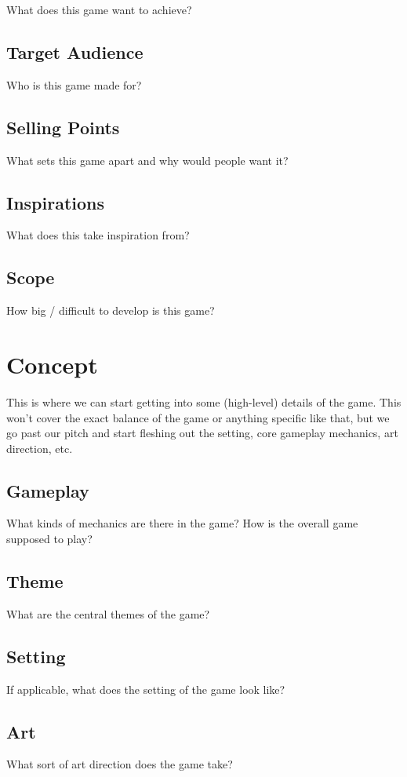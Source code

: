 What does this game want to achieve?

\subsection{Target Audience}

Who is this game made for?

\subsection{Selling Points}

What sets this game apart and why would people want it?

\subsection{Inspirations}

What does this take inspiration from?

\subsection{Scope}

How big / difficult to develop is this game?

\section{Concept}

This is where we can start getting into some (high-level) details of the game. This won't cover the exact balance of the game or anything specific like that, but we go past our pitch and start fleshing out the setting, core gameplay mechanics, art direction, etc.

\subsection{Gameplay}

What kinds of mechanics are there in the game? How is the overall game supposed to play?

\subsection{Theme}

What are the central themes of the game?

\subsection{Setting}

If applicable, what does the setting of the game look like?

\subsection{Art}

What sort of art direction does the game take?

\newpage

\switchToAppendix
\gddChangelog



